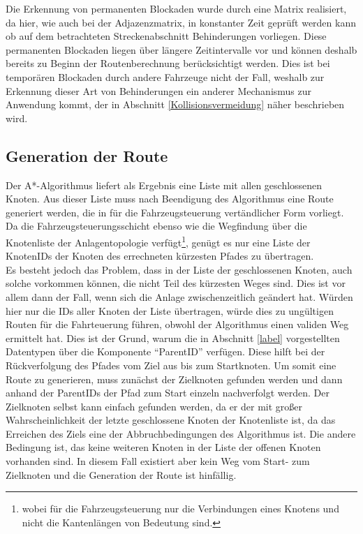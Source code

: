 			Die Erkennung von permanenten Blockaden wurde durch eine Matrix realisiert, da hier, wie auch bei der Adjazenzmatrix, in konstanter Zeit geprüft werden kann ob auf dem betrachteten Streckenabschnitt Behinderungen vorliegen. Diese permanenten Blockaden liegen über längere Zeitintervalle vor und können deshalb bereits zu Beginn der Routenberechnung berücksichtigt werden. Dies ist bei temporären Blockaden durch andere Fahrzeuge nicht der Fall, weshalb zur Erkennung dieser Art von Behinderungen ein anderer Mechanismus zur Anwendung kommt, der in Abschnitt \ref{Kollisionsvermeidung} näher beschrieben wird.
			
		\subsection{Generation der Route}
			\label{Routengeneration}
			Der A*-Algorithmus liefert als Ergebnis eine Liste mit allen geschlossenen Knoten. Aus dieser Liste muss nach Beendigung des Algorithmus eine Route generiert werden, die in für die Fahrzeugsteuerung vertändlicher Form vorliegt. Da die Fahrzeugsteuerungsschicht ebenso wie die Wegfindung über die Knotenliste der Anlagentopologie verfügt\footnote{wobei für die Fahrzeugsteuerung nur die Verbindungen eines Knotens und nicht die Kantenlängen von  Bedeutung sind.}, genügt es nur eine Liste der KnotenIDs der Knoten des errechneten kürzesten Pfades zu übertragen.
			\\
			Es besteht jedoch das Problem, dass in der Liste der geschlossenen Knoten, auch solche vorkommen können, die nicht Teil des kürzesten Weges sind. Dies ist vor allem dann der Fall, wenn sich die Anlage zwischenzeitlich geändert hat. Würden hier nur die IDs aller Knoten der Liste übertragen, würde dies zu ungültigen Routen für die Fahrteuerung führen, obwohl der Algorithmus einen validen Weg ermittelt hat. Dies ist der Grund, warum die in Abschnitt \ref{label} vorgestellten Datentypen über die Komponente "`ParentID"' verfügen. Diese hilft bei der Rückverfolgung  des Pfades vom Ziel aus bis zum Startknoten. Um somit eine Route zu generieren, muss zunächst der Zielknoten gefunden werden und dann anhand der ParentIDs der Pfad zum Start einzeln nachverfolgt werden. Der Zielknoten selbst kann einfach gefunden werden, da er der mit großer Wahrscheinlichkeit der letzte geschlossene Knoten der Knotenliste ist, da das Erreichen des Ziels eine der Abbruchbedingungen des Algorithmus ist. Die andere Bedingung ist, das keine weiteren Knoten in der Liste der offenen Knoten vorhanden sind. In diesem Fall existiert aber kein Weg vom Start- zum Zielknoten und die Generation der Route ist hinfällig.

